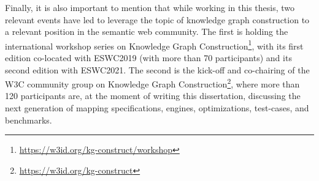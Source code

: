 Finally, it is also important to mention that while working in this thesis, two relevant events have led to leverage the topic of knowledge graph construction to a relevant position in the semantic web community. The first is holding the international workshop series on Knowledge Graph Construction\footnote{\url{https://w3id.org/kg-construct/workshop}}, with its first edition co-located with ESWC2019 (with more than 70 participants) and its second edition with ESWC2021. The second is the kick-off and co-chairing of the W3C community group on Knowledge Graph Construction\footnote{\url{https://w3id.org/kg-construct}}, where more than 120 participants are, at the moment of writing this dissertation, discussing the next generation of mapping specifications, engines, optimizations, test-cases, and benchmarks. 